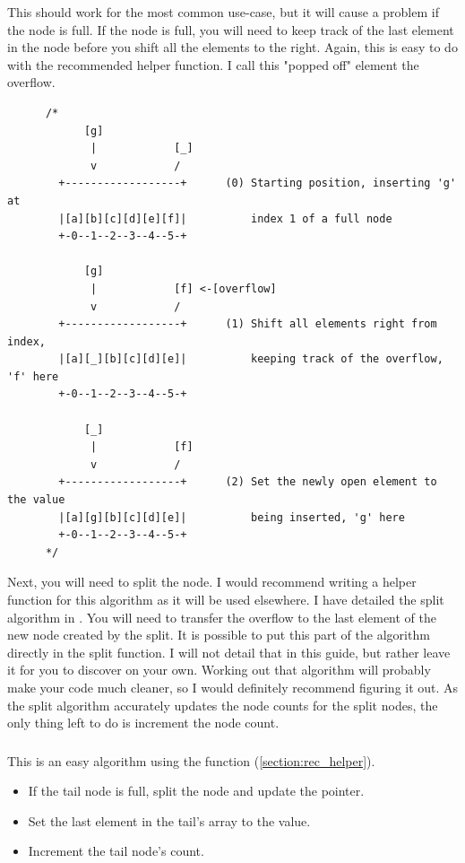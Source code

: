 \pagebreak

\indent This should work for the most common use-case, but it will cause a
problem if the node is full.
If the node is full, you will need to keep track of the last element in
the node before you shift all the elements to the right. Again, this is
easy to do with the recommended helper function.
I call this "popped off" element the overflow.

\begin{verbatim}
      /*
            [g]
             |            [_]
             v            /
        +------------------+      (0) Starting position, inserting 'g' at
        |[a][b][c][d][e][f]|          index 1 of a full node
        +-0--1--2--3--4--5-+

            [g]
             |            [f] <-[overflow]
             v            /
        +------------------+      (1) Shift all elements right from index,
        |[a][_][b][c][d][e]|          keeping track of the overflow, 'f' here
        +-0--1--2--3--4--5-+

            [_]
             |            [f]
             v            /
        +------------------+      (2) Set the newly open element to the value
        |[a][g][b][c][d][e]|          being inserted, 'g' here
        +-0--1--2--3--4--5-+
      */
\end{verbatim}

\indent Next, you will need to split the node.
I would recommend writing a helper function for this algorithm as it
will be used elsewhere. I have detailed the split algorithm in .
You will need to transfer the overflow to the last element of the new
node created by the split. It is possible to put this part of the
algorithm directly in the split function. I will not detail that in
this guide, but rather leave it for you to discover on your own.
Working out that algorithm will probably make your code much cleaner,
so I would definitely recommend figuring it out.
As the split algorithm accurately updates the node counts for the split
nodes, the only thing left to do is increment the node count.




\subsubsection{}
\indent This is an easy algorithm using the   function (\ref{section:rec_helper}).

\begin{itemize}
	\item If the tail node is full, split the node and update the  pointer.
	\item Set the last element in the tail's array to the value.
	\item Increment the tail node's count.
\end{itemize}

